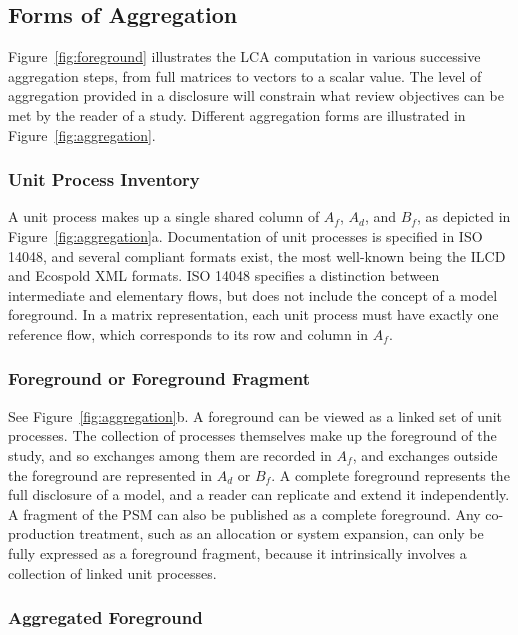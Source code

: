 \subsection{Forms of Aggregation}

Figure~\ref{fig:foreground} illustrates the LCA computation in various successive aggregation steps, from full matrices to vectors to a scalar value.  The level of aggregation provided in a disclosure will constrain what review objectives can be met by the reader of a study.  Different aggregation forms are illustrated in Figure~\ref{fig:aggregation}.

\subsubsection{Unit Process Inventory}

A unit process makes up a single shared column of $A_f$, $A_d$, and $B_f$, as depicted in Figure~\ref{fig:aggregation}a.  Documentation of unit processes is specified in ISO 14048, and several compliant formats exist, the most well-known being the ILCD and Ecospold XML formats.  ISO 14048 specifies a distinction between intermediate and elementary flows, but does not include the concept of a model foreground.  In a matrix representation, each unit process must have exactly one reference flow, which corresponds to its row and column in $A_f$.



\subsubsection{Foreground or Foreground Fragment}

See Figure~\ref{fig:aggregation}b.  A foreground can be viewed as a linked set of unit processes.  The collection of processes themselves make up the foreground of the study, and so exchanges among them are recorded in $A_f$, and exchanges outside the foreground are represented in $A_d$ or $B_f$.  A complete foreground represents
the full disclosure of a model, and a reader can replicate and extend it independently.  A fragment of the PSM can also be published as a complete foreground. Any co-production treatment, such as an allocation or system expansion, can only be fully expressed as a foreground fragment, because it intrinsically involves a collection of linked unit processes.

\subsubsection{Aggregated Foreground}

